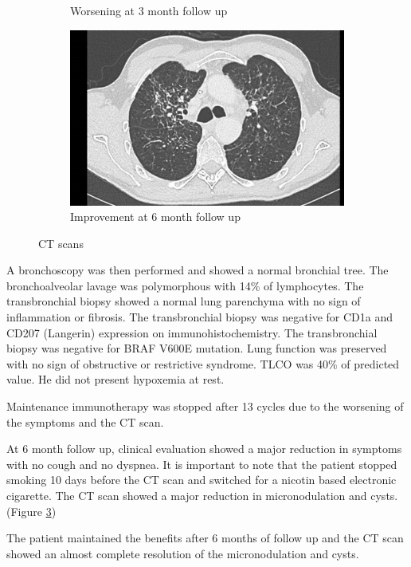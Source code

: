 \documentclass{article}
\begin{document}
\begin{figure}[ht]
\begin{subfigure}[t]{0.45\linewidth}
    \caption{Worsening at 3 month follow up}
    \label{fig:scan3}
  \end{subfigure}
  \begin{subfigure}[t]{0.45\linewidth}
    \includegraphics[width=\linewidth]{scan-m6.png}
    \caption{Improvement at 6 month follow up}
    \label{fig:scan4}
  \end{subfigure}
  \caption{CT scans}
\end{figure}
  


A bronchoscopy was then performed and showed a normal bronchial tree. The bronchoalveolar lavage was polymorphous with 14\% of lymphocytes. The transbronchial biopsy showed a normal lung parenchyma with no sign of inflammation or fibrosis. The transbronchial biopsy was negative for CD1a and CD207 (Langerin) expression on immunohistochemistry. The transbronchial biopsy was negative for BRAF V600E mutation. 
Lung function was preserved with no sign of obstructive or restrictive syndrome. TLCO was 40\% of predicted value. He did not present hypoxemia at rest.

Maintenance immunotherapy was stopped after 13 cycles due to the worsening of the symptoms and the CT scan. 

At 6 month follow up, clinical evaluation showed a major reduction in symptoms with no cough and no dyspnea. It is important to note that the patient stopped smoking 10 days before the CT scan and switched for a nicotin based electronic cigarette.
The CT scan showed a major reduction in micronodulation and cysts. (Figure \ref{fig:scan4})

The patient maintained the benefits after 6 months of follow up and the CT scan showed an almost complete resolution of the micronodulation and cysts.
\end{document}

